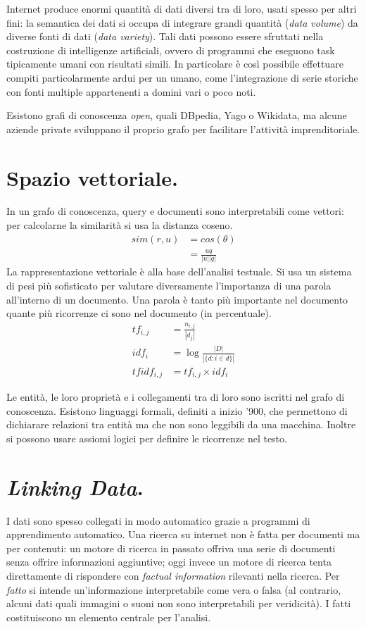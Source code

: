\documentclass[11pt]{article}
\begin{document}
\begin{multicols}{2}
Internet produce enormi quantità di dati diversi tra di loro, usati spesso per altri fini: la semantica dei dati si occupa di integrare grandi quantità (\textit{data volume}) da diverse fonti di dati (\textit{data variety}).
Tali dati possono essere sfruttati nella costruzione di intelligenze artificiali, ovvero di programmi che eseguono task tipicamente umani con risultati simili.
In particolare è così possibile effettuare compiti particolarmente ardui per un umano, come l'integrazione di serie storiche con fonti multiple appartenenti a domini vari o poco noti.

Esistono grafi di conoscenza \textit{open}, quali DBpedia, Yago o Wikidata, ma alcune aziende private sviluppano il proprio grafo per facilitare l'attività imprenditoriale.


\section{Spazio vettoriale.}
In un grafo di conoscenza, query e documenti sono interpretabili come vettori: per calcolarne la similarità si usa la distanza coseno.
\begin{align*}
  sim(r, u) &= cos(\theta) \\
            &= \frac{u q}{|u| |q|}
  \end{align*}
La rappresentazione vettoriale è alla base dell'analisi testuale.
Si usa un sistema di pesi più sofisticato per valutare diversamente l'importanza di una parola all'interno di un documento.
Una parola è tanto più importante nel documento quante più ricorrenze ci sono nel documento (in percentuale).
\begin{align*}
  tf_{i, j} &= \frac{n_{i,j}}{|d_j|} \\
  idf_i &= \log{\frac{|D|}{|\{d : i \in d\}|}} \\
  tfidf_{i, j} &= tf_{i, j} \times idf_i
\end{align*}

Le entità, le loro proprietà e i collegamenti tra di loro sono iscritti nel grafo di conoscenza.
Esistono linguaggi formali, definiti a inizio '900, che permettono di dichiarare relazioni tra entità ma che non sono leggibili da una macchina.
Inoltre si possono usare assiomi logici per definire le ricorrenze nel testo.


\section{\textit{Linking Data}.}
I dati sono spesso collegati in modo automatico grazie a programmi di apprendimento automatico.
Una ricerca su internet non è fatta per documenti ma per contenuti: un motore di ricerca in passato offriva una serie di documenti senza offrire informazioni aggiuntive; oggi invece un motore di ricerca tenta direttamente di rispondere con \textit{factual information} rilevanti nella ricerca.
Per \textit{fatto} si intende un'informazione interpretabile come vera o falsa (al contrario, alcuni dati quali immagini o suoni non sono interpretabili per veridicità).
I fatti costituiscono un elemento centrale per l'analisi.


\end{multicols}
\end{document}
